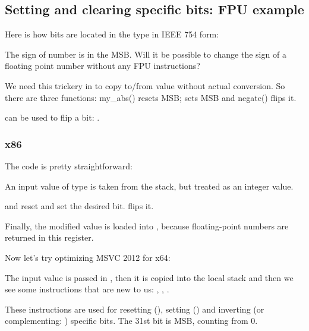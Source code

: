 \subsection{Setting and clearing specific bits: \ac{FPU} example}


Here is how bits are located in the \Tfloat type in IEEE 754 form:



The sign of number is in the \ac{MSB}. 
Will it be possible to change the sign of a floating point number without any FPU instructions?



We need this trickery in \CCpp to copy to/from \Tfloat value without actual conversion.
So there are three functions: my\_abs() resets \ac{MSB};  sets \ac{MSB} and negate() flips it.

\XOR can be used to flip a bit: .

\subsubsection{x86}

The code is pretty straightforward:



An input value of type \Tfloat is taken from the stack, but treated as an integer value.

\AND and \OR reset and set the desired bit.
\XOR flips it.

Finally, the modified value is loaded into , because floating-point numbers are returned in this register.

Now let's try optimizing MSVC 2012 for x64:




The input value is passed in , then it is copied into the local stack and then we see 
some instructions that are new to us: \BTR, \BTS, \BTC.

These instructions are used for resetting (\BTR), setting (\BTS) and inverting (or complementing: \BTC) 
specific bits.
The 31st bit is \ac{MSB}, counting from 0.

